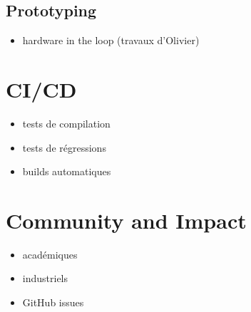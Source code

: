 \subsection{Prototyping}

\begin{itemize}
  \item hardware in the loop (travaux d'Olivier)
\end{itemize}

\section{CI/CD}

\begin{itemize}
  \item tests de compilation
  \item tests de régressions
  \item builds automatiques
\end{itemize}

\section{Community and Impact}

\begin{itemize}
  \item académiques
  \item industriels
  \item GitHub issues
\end{itemize}